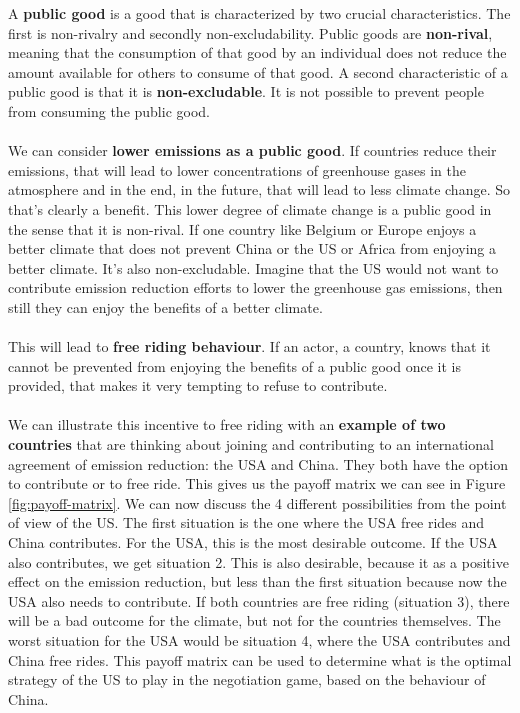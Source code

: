 \documentclass[../summary.tex]{subfiles}
\begin{document}
	  A \textbf{public good} is a good that is characterized by two crucial characteristics. The first is non-rivalry and secondly non-excludability. Public goods are \textbf{non-rival}, meaning that the consumption of that good by an individual does not reduce the amount available for others to consume of that good. A second characteristic of a public good is that it is \textbf{non-excludable}. It is not possible to prevent people from consuming the public good. 
	  \\\\
	  We can consider \textbf{lower emissions as a public good}. If countries reduce their emissions, that will lead to lower concentrations of greenhouse gases in the atmosphere and in the end, in the future, that will lead to less climate change. So that's clearly a benefit. This lower degree of climate change is a public good in the sense that it is non-rival. If one country like Belgium or Europe enjoys a better climate that does not prevent China or the US or Africa from enjoying a better climate. It’s also non-excludable. Imagine that the US would not want to contribute emission reduction efforts to lower the greenhouse gas emissions, then still they can enjoy the benefits of a better climate.
	  \\\\
	  This will lead to \textbf{free riding behaviour}. If an actor, a country, knows that it cannot be prevented from enjoying the benefits of a public good once it is provided, that makes it very tempting to refuse to contribute. 
	  \\\\
	  We can illustrate this incentive to free riding with an \textbf{example of two countries} that are thinking about joining and contributing to an international agreement of emission reduction: the USA and China. They both have the option to contribute or to free ride. This gives us the payoff matrix we can see in Figure \ref{fig:payoff-matrix}. We can now discuss the 4 different possibilities from the point of view of the US. The first situation is the one where the USA free rides and China contributes. For the USA, this is the most desirable outcome. If the USA also contributes, we get situation 2. This is also desirable, because it as a positive effect on the emission reduction, but less than the first situation because now the USA also needs to contribute. If both countries are free riding (situation 3), there will be a bad outcome for the climate, but not for the countries themselves. The worst situation for the USA would be situation 4, where the USA contributes and China free rides. This payoff matrix can be used to determine what is the optimal strategy of the US to play in the negotiation game, based on the behaviour of China.
	  
\end{document}
